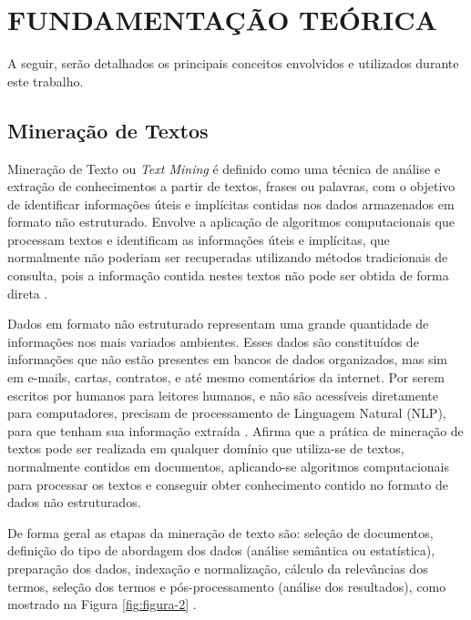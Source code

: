 \newpage
\section{FUNDAMENTAÇÃO TEÓRICA}

A seguir, serão detalhados os principais conceitos envolvidos e utilizados durante este trabalho.


\subsection{Mineração de Textos}
Mineração de Texto ou \textit{Text Mining} é definido como uma técnica de análise e extração de conhecimentos a partir de textos, frases ou palavras, com o objetivo de identificar informações úteis e implícitas contidas nos dados armazenados em formato não estruturado. Envolve a aplicação de algoritmos computacionais que processam textos e identificam as informações úteis e implícitas, que normalmente não poderiam ser recuperadas utilizando métodos tradicionais de consulta, pois a informação contida nestes textos não pode ser obtida de forma direta \cite{morais2007mineraccao}.

Dados em formato não estruturado representam uma grande quantidade de informações nos mais variados ambientes. Esses dados são constituídos de informações que não estão presentes em bancos de dados organizados, mas sim em e-mails, cartas, contratos, e até mesmo comentários da internet. Por serem escritos por humanos para leitores humanos, e não são acessíveis diretamente para computadores, precisam de processamento de Linguagem Natural (NLP), para que tenham sua informação extraída \cite{Dorre1999TMFTextMining}. \cite{lucasAraujo2015} Afirma que a prática de mineração de textos pode ser realizada em qualquer domínio que utiliza-se de textos, normalmente contidos em documentos, aplicando-se algoritmos computacionais para processar os textos e conseguir obter conhecimento contido no formato de dados não estruturados. 

De forma geral as etapas da mineração de texto são: seleção de documentos, definição do tipo de abordagem dos dados (análise semântica ou estatística), preparação dos dados, indexação e normalização, cálculo da relevâncias dos termos, seleção dos termos e pós-processamento (análise dos resultados), como mostrado na Figura \ref{fig:figura-2} \cite{morais2007mineraccao}.

